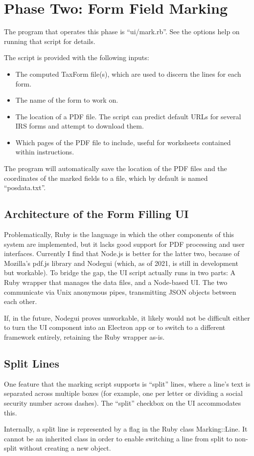 \section{Phase Two: Form Field Marking}

The program that operates this phase is ``ui/mark.rb''. See the options help on
running that script for details.

The script is provided with the following inputs:
\begin{itemize}
\item The computed TaxForm file(s), which are used to discern the lines for each
form.
\item The name of the form to work on.
\item The location of a PDF file. The script can predict default URLs for
several IRS forms and attempt to download them.
\item Which pages of the PDF file to include, useful for worksheets contained
within instructions.
\end{itemize}
The program will automatically save the location of the PDF files and the
coordinates of the marked fields to a file, which by default is named
``\hbox{posdata.txt}''.


\subsection{Architecture of the Form Filling UI}

Problematically, Ruby is the language in which the other components of this
system are implemented, but it lacks good support for PDF processing and user
interfaces. Currently I find that Node.js is better for the latter two, because
of Mozilla's pdf.js library and Nodegui (which, as of 2021, is still in
development but workable). To bridge the gap, the UI script actually runs in two
parts: A Ruby wrapper that manages the data files, and a Node-based UI. The two
communicate via Unix anonymous pipes, transmitting JSON objects between each
other.

If, in the future, Nodegui proves unworkable, it likely would not be difficult
either to turn the UI component into an Electron app or to switch to a different
framework entirely, retaining the Ruby wrapper as-is.


\subsection{Split Lines}

One feature that the marking script supports is ``split'' lines, where a line's
text is separated across multiple boxes (for example, one per letter or dividing
a social security number across dashes). The ``split'' checkbox on the UI
accommodates this.

Internally, a split line is represented by a flag in the Ruby class
Marking::Line. It cannot be an inherited class in order to enable switching
a line from split to non-split without creating a new object.




